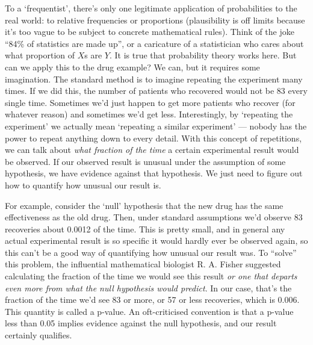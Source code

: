 \documentclass[a4paper, 12pt]{article}
\begin{document}
To a `frequentist', there's only one legitimate application of probabilities to
the real world: to relative frequencies or proportions
(plausibility is off
limits because it's too vague to be subject to concrete mathematical rules).
Think of the joke
``84\% of statistics are made up'', or a caricature of a statistician who cares
about what proportion of $X$s are $Y$. It is true that probability theory works
here. But can we apply this to the drug example? We can, but it requires
some imagination.
The standard method is to imagine repeating the experiment many times.
If we did this, the number of patients who recovered would
not be 83 every single time. Sometimes we'd just happen to get more patients
who recover (for whatever reason) and sometimes we'd get less. Interestingly,
by `repeating the experiment' we actually mean `repeating a similar experiment'
--- nobody has the power to repeat anything down to every detail.
With this concept of repetitions, we can talk about {\em what fraction of the
time} a certain experimental result would be observed. If our observed result
is unusual under the assumption of some hypothesis, we have evidence against
that hypothesis. We just need to figure out how to quantify how unusual our
result is.

For example, consider the `null' hypothesis that the new drug
has the same effectiveness as the old drug. Then, under standard assumptions we'd
observe 83 recoveries about 0.0012 of the time. This is pretty small, and in
general any actual experimental result is so specific it would hardly
ever be observed again, so this can't be a good way of quantifying how unusual
our result was. To ``solve'' this problem, the influential mathematical
biologist R. A. Fisher suggested calculating the fraction of the time we would
see this result {\em or one that departs even more from what the null
hypothesis would predict}. In our case, that's the fraction of the time we'd
see 83 or more, or 57 or less recoveries, which is 0.006.
This quantity is called a p-value.
An oft-criticised convention is that a p-value less than 0.05 implies evidence
against the null hypothesis, and our result certainly qualifies.
\end{document}
